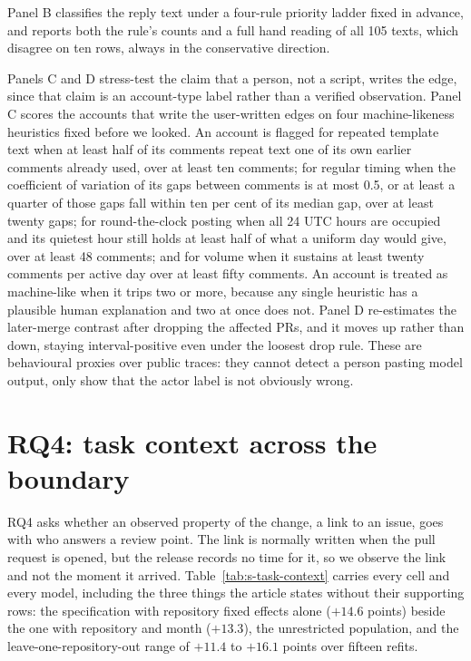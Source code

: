 \documentclass[pdflatex,sn-basic]{sn-jnl}
\begin{document}
Panel B classifies the reply text under a four-rule priority ladder fixed in
advance, and reports both the rule's counts and a full hand reading of all 105
texts, which disagree on ten rows, always in the conservative direction.

Panels C and D stress-test the claim that a person, not a script, writes the
edge, since that claim is an account-type label rather than a verified
observation. Panel C scores the accounts that write the user-written edges on
four machine-likeness heuristics fixed before we looked. An account is
flagged for repeated template text when at least half of its comments repeat
text one of its own earlier comments already used, over at least ten
comments; for regular timing when the coefficient of variation of its gaps
between comments is at most 0.5, or at least a quarter of those gaps fall
within ten per cent of its median gap, over at least twenty gaps; for
round-the-clock posting when all 24 UTC hours are occupied and its quietest
hour still holds at least half of what a uniform day would give, over at
least 48 comments; and for volume when it sustains at least twenty comments
per active day over at least fifty comments. An account is treated as
machine-like when it trips two or more, because any single heuristic has a
plausible human explanation and two at once does not. Panel D re-estimates the
later-merge contrast after dropping the affected PRs, and it moves up rather
than down, staying interval-positive even under the loosest drop rule. These are
behavioural proxies over public traces: they cannot detect a person pasting
model output, only show that the actor label is not obviously wrong.



\section{RQ4: task context across the boundary}\label{app:rq4}

RQ4 asks whether an observed property of the change, a link to an issue, goes
with who answers a review point. The link is normally written when the pull
request is opened, but the release records no time for it, so we observe the link
and not the moment it arrived. Table~\ref{tab:s-task-context} carries every cell and every model,
including the three things the article states without their supporting rows: the
specification with repository fixed effects alone ($+14.6$ points) beside the
one with repository and month ($+13.3$), the unrestricted population, and the
leave-one-repository-out range of $+11.4$ to $+16.1$ points over fifteen refits.
\end{document}
